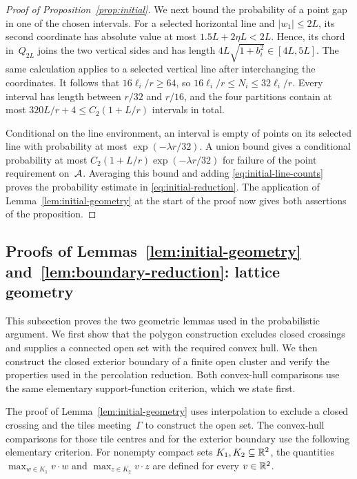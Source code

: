 \documentclass[11pt,letterpaper]{article}
\begin{document}
\begin{proof}[Proof of Proposition~\ref{prop:initial}]
We next bound the probability of a point gap in one of the chosen intervals. For a selected horizontal line and $\lvert w_1\rvert\le2L$, its second coordinate has absolute value at most $1.5L+2\eta L<2L$. Hence, its chord in~$Q_{2L}$ joins the two vertical sides and has length $4L\sqrt{1+b_i^2}\in[4L,5L]$. The same calculation applies to a selected vertical line after interchanging the coordinates. It follows that $16\ell_i/r\ge64$, so $16\ell_i/r\le N_i\le32\ell_i/r$. Every interval has length between $r/32$ and $r/16$, and the four partitions contain at most $320L/r+4\le C_2(1+L/r)$ intervals in total.

Conditional on the line environment, an interval is empty of points on its selected line with probability at most $\exp(-\lambda r/32)$. A union bound gives a conditional probability at most $C_2(1+L/r)\exp(-\lambda r/32)$ for failure of the point requirement on~$\mathcal A$. Averaging this bound and adding \eqref{eq:initial-line-counts} proves the probability estimate in \eqref{eq:initial-reduction}. The application of Lemma~\ref{lem:initial-geometry} at the start of the proof now gives both assertions of the proposition.
\end{proof}

\subsection{Proofs of \texorpdfstring{Lemmas~\ref{lem:initial-geometry} and~\ref{lem:boundary-reduction}}{the geometric lemmas}: lattice geometry}
\label{sec:geometry}

This subsection proves the two geometric lemmas used in the probabilistic argument. We first show that the polygon construction excludes closed crossings and supplies a connected open set with the required convex hull. We then construct the closed exterior boundary of a finite open cluster and verify the properties used in the percolation reduction. Both convex-hull comparisons use the same elementary support-function criterion, which we state first.

The proof of Lemma~\ref{lem:initial-geometry} uses interpolation to exclude a closed crossing and the tiles meeting~$\Gamma$ to construct the open set. The convex-hull comparisons for those tile centres and for the exterior boundary use the following elementary criterion. For nonempty compact sets $K_1,K_2\subseteq\mathbb R^2$, the quantities $\max_{w\in K_1}v\cdot w$ and $\max_{z\in K_2}v\cdot z$ are defined for every $v\in\mathbb R^2$.
\end{document}
